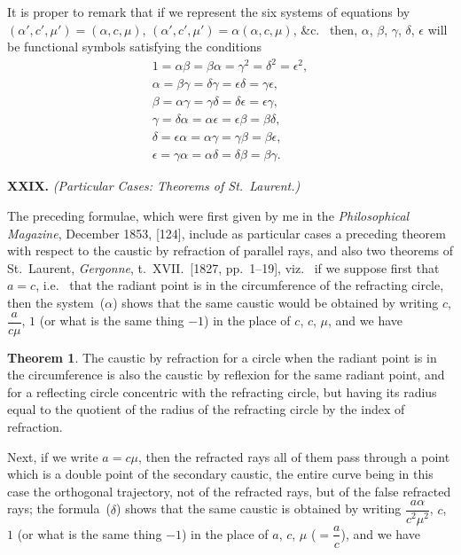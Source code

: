 \documentclass[12pt,a4paper]{article}
\theoremstyle{definition}
\newtheorem*{theorem}{Theorem}
\newcommand{\viz}{viz.\ }
\newcommand{\ie}{i.e.\ }
\newcommand{\etc}{\&c.\ }
\begin{document}
It is proper to remark that if we represent the six systems
of equations by
$(\alpha', c', \mu') = (\alpha, c, \mu)$,
$(\alpha', c', \mu') = \alpha(\alpha, c, \mu)$, \etc{}
then, $\alpha$, $\beta$, $\gamma$, $\delta$, $\epsilon$ will be functional symbols
satisfying the conditions
\begin{gather*}
1 = \alpha\beta = \beta\alpha = \gamma^{2} = \delta^{2} = \epsilon^{2}, \\
\alpha = \beta\gamma = \delta\gamma = \epsilon\delta = \gamma\epsilon, \\
\beta = \alpha\gamma = \gamma\delta = \delta\epsilon = \epsilon\gamma, \\
\gamma = \delta\alpha = \alpha\epsilon = \epsilon\beta = \beta\delta, \\
\delta = \epsilon\alpha = \alpha\gamma = \gamma\beta = \beta\epsilon, \\
\epsilon = \gamma\alpha = \alpha\delta = \delta\beta = \beta\gamma.
\end{gather*}

\medskip\noindent\textbf{XXIX.}
\textit{(Particular Cases: Theorems of St.~Laurent.)}

The preceding formulae, which were first given by me in the
\textit{Philosophical Magazine}, December 1853, [124], include as particular
cases a preceding theorem with respect to the caustic by refraction
of parallel rays, and also two theorems of St.~Laurent,
\textit{Gergonne}, t.~XVII.\ [1827, pp.~1--19], \viz{} if we suppose first
that $a = c$, \ie{} that the radiant point is in the circumference
of the refracting circle, then the system~($\alpha$) shows that the
same caustic would be obtained by writing $c$, $\dfrac{a}{c\mu}$, $1$
(or what is the same thing $-1$) in the place of $c$, $c$, $\mu$,
and we have

\begin{theorem}
The caustic by refraction for a circle when the radiant point
is in the circumference is also the caustic by reflexion for the
same radiant point, and for a reflecting circle concentric with
the refracting circle, but having its radius equal to the quotient
of the radius of the refracting circle by the index of refraction.
\end{theorem}

Next, if we write $a = c\mu$, then the refracted rays all of them
pass through a point which is a double point of the secondary
caustic, the entire curve being in this case the orthogonal
trajectory, not of the refracted rays, but of the false refracted rays;
the formula~($\delta$) shows that the same caustic is obtained by
writing $\dfrac{a\alpha}{c^{2}\mu^{2}}$, $c$, $1$ (or what is the same thing $-1$)
in the place of $a$, $c$, $\mu$ ($= \dfrac{a}{c}$), and we have
\end{document}
